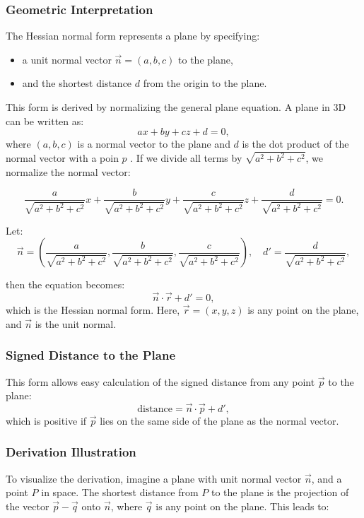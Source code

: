 \subsubsection*{Geometric Interpretation}

The Hessian normal form represents a plane by specifying:
\begin{itemize}
	\item a unit normal vector $\vec{n} = (a, b, c)$ to the plane,
	\item and the shortest distance $d$ from the origin to the plane.
\end{itemize}

This form is derived by normalizing the general plane equation. A plane in 3D can be written as:
\[
	ax + by + cz + d = 0,
\]
where $(a, b, c)$ is a normal vector to the plane and $d$ is the dot product of the normal vector with a poin $p$ . If we divide all terms by $\sqrt{a^2 + b^2 + c^2}$, we normalize the normal vector:

\[
	\frac{a}{\sqrt{a^2 + b^2 + c^2}}x + \frac{b}{\sqrt{a^2 + b^2 + c^2}}y + \frac{c}{\sqrt{a^2 + b^2 + c^2}}z + \frac{d}{\sqrt{a^2 + b^2 + c^2}} = 0.
\]

Let:
\[
	\vec{n} = \left(\frac{a}{\sqrt{a^2 + b^2 + c^2}}, \frac{b}{\sqrt{a^2 + b^2 + c^2}}, \frac{c}{\sqrt{a^2 + b^2 + c^2}}\right), \quad d' = \frac{d}{\sqrt{a^2 + b^2 + c^2}},
\]

then the equation becomes:
\[
	\vec{n} \cdot \vec{r} + d' = 0,
\]
which is the Hessian normal form. Here, $\vec{r} = (x, y, z)$ is any point on the plane, and $\vec{n}$ is the unit normal.

\subsubsection*{Signed Distance to the Plane}

This form allows easy calculation of the signed distance from any point $\vec{p}$ to the plane:
\[
	\text{distance} = \vec{n} \cdot \vec{p} + d',
\]
which is positive if $\vec{p}$ lies on the same side of the plane as the normal vector.

\subsubsection*{Derivation Illustration}

To visualize the derivation, imagine a plane with unit normal vector $\vec{n}$, and a point $P$ in space. The shortest distance from $P$ to the plane is the projection of the vector $\vec{p} - \vec{q}$ onto $\vec{n}$, where $\vec{q}$ is any point on the plane. This leads to:

